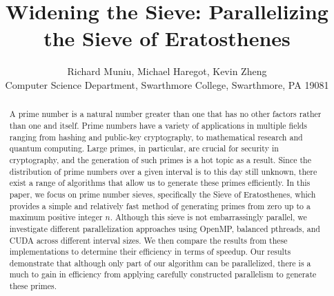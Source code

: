 \documentclass[11pt,twocolumn]{article}
\begin{document}
\title{Widening the Sieve: Parallelizing the Sieve of Eratosthenes}

\author{Richard Muniu, Michael Haregot, Kevin Zheng \\
Computer Science Department, Swarthmore College, Swarthmore, PA  19081}

\maketitle

\begin{abstract}
A prime number is a natural number greater than one that has no other factors 
rather than one and itself. Prime numbers have a variety of applications in 
multiple fields ranging from hashing and public-key cryptography, to mathematical 
research and quantum computing. Large primes, in particular, are crucial for 
security in cryptography, and the generation of such primes is a hot topic as 
a result. Since the distribution of prime numbers over a given interval is to 
this day still unknown, there exist a range of algorithms that allow us to 
generate 
these primes efficiently. In this paper, we focus on prime number sieves, 
specifically the Sieve of Eratosthenes, which provides a simple and relatively 
fast method of generating primes from zero up to a maximum positive integer 
$n$. Although this sieve is not embarrassingly parallel, we investigate 
different parallelization approaches using OpenMP, balanced pthreads, 
and CUDA across different interval sizes. We then compare the results from 
these implementations to determine their efficiency in terms of speedup. 
Our results demonstrate that although only part of our algorithm can be 
parallelized, there is a much to gain in efficiency from applying carefully 
constructed parallelism to generate these primes.





\end{abstract}
\end{document}
